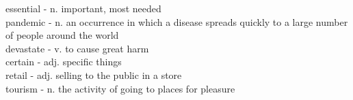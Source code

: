 essential - n. important, most needed \\

pandemic - n. an occurrence in which a disease spreads quickly to a large number of people around the world \\

devastate - v. to cause great harm \\

certain - adj. specific things \\

retail - adj. selling to the public in a store \\

tourism - n. the activity of going to places for pleasure \\





